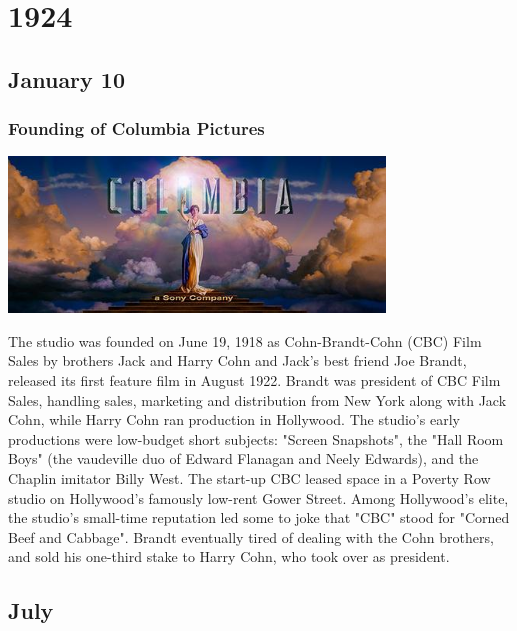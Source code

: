 \documentclass[11pt]{report}
\begin{document}
\chapter{1924}
\section{January 10}
\subsection{Founding of Columbia Pictures}
\vspace{2mm}\begin{center}\includegraphics[width=10cm]{./img/columbiaPicLogo.jpg}\end{center}
The studio was founded on June 19, 1918 as Cohn-Brandt-Cohn (CBC) Film Sales by brothers Jack and Harry Cohn and Jack's best friend Joe Brandt, released its first feature film in August 1922. Brandt was president of CBC Film Sales, handling sales, marketing and distribution from New York along with Jack Cohn, while Harry Cohn ran production in Hollywood. The studio's early productions were low-budget short subjects: "Screen Snapshots", the "Hall Room Boys" (the vaudeville duo of Edward Flanagan and Neely Edwards), and the Chaplin imitator Billy West. The start-up CBC leased space in a Poverty Row studio on Hollywood's famously low-rent Gower Street. Among Hollywood's elite, the studio's small-time reputation led some to joke that "CBC" stood for "Corned Beef and Cabbage". Brandt eventually tired of dealing with the Cohn brothers, and sold his one-third stake to Harry Cohn, who took over as president.
\section{July}
\end{document}
